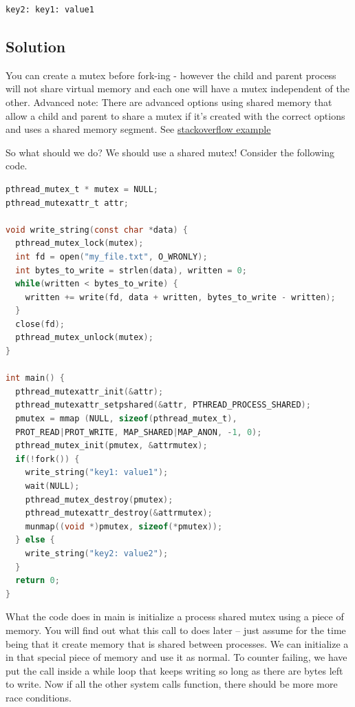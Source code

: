 \begin{lstlisting}
key2: key1: value1
\end{lstlisting}

\subsection{Solution}

You can create a mutex before fork-ing - however the child and parent process will not share virtual memory and each one will have a mutex independent of the other.
Advanced note: There are advanced options using shared memory that allow a child and parent to share a mutex if it's created with the correct options and uses a shared memory segment.
See \href{http://stackoverflow.com/questions/19172541/procs-fork-and-mutexes}{stackoverflow example}

So what should we do? We should use a shared mutex! Consider the following code.

\begin{lstlisting}[language=C]
pthread_mutex_t * mutex = NULL;
pthread_mutexattr_t attr;

void write_string(const char *data) {
  pthread_mutex_lock(mutex);
  int fd = open("my_file.txt", O_WRONLY);
  int bytes_to_write = strlen(data), written = 0;
  while(written < bytes_to_write) {
    written += write(fd, data + written, bytes_to_write - written);
  }
  close(fd);
  pthread_mutex_unlock(mutex);
}

int main() {
  pthread_mutexattr_init(&attr);
  pthread_mutexattr_setpshared(&attr, PTHREAD_PROCESS_SHARED);
  pmutex = mmap (NULL, sizeof(pthread_mutex_t),
  PROT_READ|PROT_WRITE, MAP_SHARED|MAP_ANON, -1, 0);
  pthread_mutex_init(pmutex, &attrmutex);
  if(!fork()) {
    write_string("key1: value1");
    wait(NULL);
    pthread_mutex_destroy(pmutex);
    pthread_mutexattr_destroy(&attrmutex);
    munmap((void *)pmutex, sizeof(*pmutex));
  } else {
    write_string("key2: value2");
  }
  return 0;
}
\end{lstlisting}

What the code does in main is initialize a process shared mutex using a piece of  memory.
You will find out what this call to  does later -- just assume for the time being that it create memory that is shared between processes.
We can initialize a  in that special piece of memory and use it as normal.
To counter  failing, we have put the  call inside a while loop that keeps writing so long as there are bytes left to write.
Now if all the other system calls function, there should be more more race conditions.

